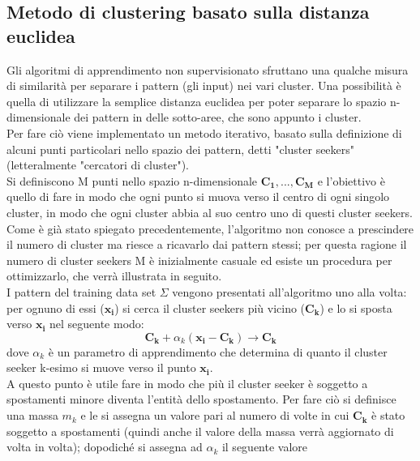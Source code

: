 \subsection{Metodo di clustering basato sulla distanza euclidea}
\label{metodo distanza euclidea}
Gli algoritmi di apprendimento non supervisionato sfruttano una qualche misura di similarità per separare i pattern (gli input) nei vari cluster. Una possibilità è quella di utilizzare la semplice distanza euclidea per poter separare lo spazio n-dimensionale dei pattern in delle sotto-aree, che sono appunto i cluster. \\
Per fare ciò viene implementato un metodo iterativo, basato sulla definizione di alcuni punti particolari nello spazio dei pattern, detti "cluster seekers" (letteralmente "cercatori di cluster"). \\
Si definiscono M punti nello spazio n-dimensionale $\textbf{C}_\textbf{1},...,\textbf{C}_\textbf{M}$ e l'obiettivo è quello di fare in modo che ogni punto si muova verso il centro di ogni singolo cluster, in modo che ogni cluster abbia al suo centro uno di questi cluster seekers. \\
Come è già stato spiegato precedentemente, l'algoritmo non conosce a prescindere il numero di cluster ma riesce a ricavarlo dai pattern stessi; per questa ragione il numero di cluster seekers M è inizialmente casuale ed esiste un procedura per ottimizzarlo, che verrà illustrata in seguito. \\
I pattern del training data set $\Sigma$ vengono presentati all'algoritmo uno alla volta: per ognuno di essi ($\textbf{x}_\textbf{i}$) si cerca il cluster seekers più vicino ($\textbf{C}_\textbf{k}$) e lo si sposta verso $\textbf{x}_\textbf{i}$ nel seguente modo:
\begin{equation}
\textbf{C}_\textbf{k} + \alpha_k(\textbf{x}_\textbf{i} - \textbf{C}_\textbf{k}) \rightarrow \textbf{C}_\textbf{k}
\end{equation}
dove $\alpha_k$ è un parametro di apprendimento che determina di quanto il cluster seeker k-esimo si muove verso il punto $\textbf{x}_\textbf{i}$. \\
A questo punto è utile fare in modo che più il cluster seeker è soggetto a spostamenti minore diventa l'entità dello spostamento. Per fare ciò si definisce una massa $m_k$ e le si assegna un valore pari al numero di volte in cui $\textbf{C}_\textbf{k}$ è stato soggetto a spostamenti (quindi anche il valore della massa verrà aggiornato di volta in volta); dopodiché si assegna ad $\alpha_k$ il seguente valore
